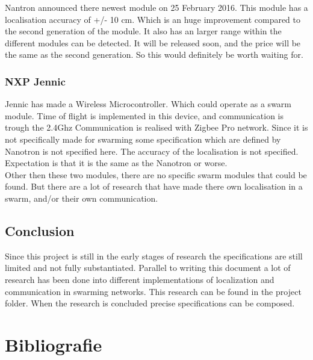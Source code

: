 \documentclass[10pt,a4paper]{article}
\begin{document}
Nantron announced there newest module on 25 February 2016. This module has a localisation accuracy of +/- 10 cm. Which is an huge improvement compared to the second generation of the module. It also has an larger range within the different modules can be detected. It will be released soon, and the price will be the same as the second generation. So this would definitely be worth waiting for. \cite{nanotron}
	
\subsubsection{NXP Jennic} 

Jennic has made a Wireless Microcontroller. Which could operate as a swarm module. Time of flight is implemented in this device, and communication is trough the 2.4Ghz Communication is realised with Zigbee Pro network. Since it is not specifically made for swarming some specification which are defined by Nanotron is not specified here. The accuracy of the localisation is not specified. Expectation is that it is the same as the Nanotron or worse. \cite{wirelessmicrocontroller}\\

Other then these two modules, there are no specific swarm modules that could be found. But there are a lot of research that have made there own localisation in a swarm, and/or their own communication. 

\subsection{Conclusion}
Since this project is still in the early stages of research the specifications are still limited and not fully substantiated. Parallel to writing this document a lot of research has been done into different implementations of localization and communication in swarming networks. This research can be found in the project folder. When the research is concluded precise specifications can be composed. 

\newpage



\section{Bibliografie}


\end{document}
